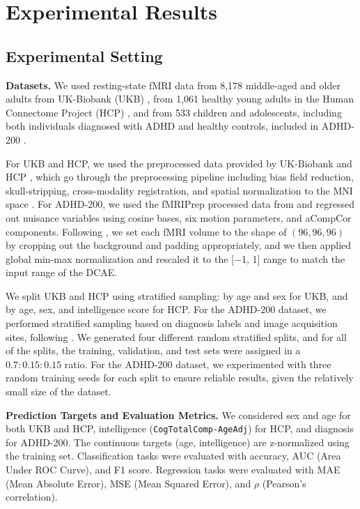 \section{Experimental Results}



\label{sec:experimental results}

\subsection{Experimental Setting}
\label{sec:4.1}
\noindent \textbf{Datasets.}
We used resting-state fMRI data from 8,178 middle-aged and older adults from UK-Biobank (UKB) \citep{UKB}, from 1,061 healthy young adults in the Human Connectome Project (HCP) \citep{HCP}, and from 533 children and adolescents, including both individuals diagnosed with ADHD and healthy controls, included in ADHD-200 \citep{ADHD}.

For UKB and HCP, we used the preprocessed data provided by UK-Biobank \citep{UKB_preproc1, UKB_preproc2} and  HCP \citep{HCP}, which go through the preprocessing pipeline including bias field reduction, skull-stripping, cross-modality registration, and spatial normalization to the MNI space \citep{MNI152}.
For ADHD-200, we used the fMRIPrep \citep{fmriprep1, fmriprep2} processed data from \citet{ADHD} and regressed out nuisance variables using cosine bases, six motion parameters, and aCompCor components.
Following \citet{swift}, we set each fMRI volume to the shape of $(96,96,96)$ by cropping out the background and padding appropriately, and we then applied global min-max normalization and rescaled it to the [$-$1, 1] range to match the input range of the DCAE.

We split UKB and HCP using stratified sampling: by age and sex for UKB, and by age, sex, and intelligence score for HCP.
For the ADHD-200 dataset, we performed stratified sampling based on diagnosis labels and image acquisition sites, following \citet{BNT}.
We generated four different random stratified splits, and for all of the splits, the training, validation, and test sets were assigned in a $0.7:0.15:0.15$ ratio. For the ADHD-200 dataset, we experimented with three random training seeds for each split to ensure reliable results, given the relatively small size of the dataset.

\noindent \textbf{Prediction Targets and Evaluation Metrics.}
We considered sex and age for both UKB and HCP, intelligence (\texttt{CogTotalComp-AgeAdj}) for HCP, and diagnosis for ADHD-200. The continuous targets (age, intelligence) are z-normalized using the training set.
Classification tasks were evaluated with accuracy, AUC (Area Under ROC Curve), and F1 score. Regression tasks were evaluated with MAE (Mean Absolute Error), MSE (Mean Squared Error), and $\rho$ (Pearson’s correlation).

